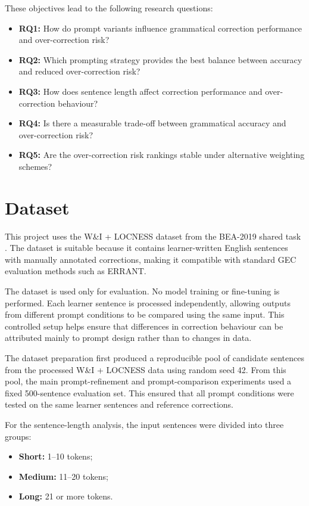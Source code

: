 These objectives lead to the following research questions:

\begin{itemize}
    \item \textbf{RQ1:} How do prompt variants influence grammatical correction performance and over-correction risk?
    \item \textbf{RQ2:} Which prompting strategy provides the best balance between accuracy and reduced over-correction risk?
    \item \textbf{RQ3:} How does sentence length affect correction performance and over-correction behaviour?
    \item \textbf{RQ4:} Is there a measurable trade-off between grammatical accuracy and over-correction risk?
    \item \textbf{RQ5:} Are the over-correction risk rankings stable under alternative weighting schemes?
\end{itemize}

\section{Dataset}

This project uses the W\&I + LOCNESS dataset from the BEA-2019 shared task \cite{bryant-etal-2019-bea}. The dataset is suitable because it contains learner-written English sentences with manually annotated corrections, making it compatible with standard GEC evaluation methods such as ERRANT.

The dataset is used only for evaluation. No model training or fine-tuning is performed. Each learner sentence is processed independently, allowing outputs from different prompt conditions to be compared using the same input. This controlled setup helps ensure that differences in correction behaviour can be attributed mainly to prompt design rather than to changes in data.

The dataset preparation first produced a reproducible pool of candidate sentences from the processed W\&I + LOCNESS data using random seed 42. From this pool, the main prompt-refinement and prompt-comparison experiments used a fixed 500-sentence evaluation set. This ensured that all prompt conditions were tested on the same learner sentences and reference corrections.

For the sentence-length analysis, the input sentences were divided into three groups:

\begin{itemize}
    \item \textbf{Short:} 1--10 tokens;
    \item \textbf{Medium:} 11--20 tokens;
    \item \textbf{Long:} 21 or more tokens.
\end{itemize}

